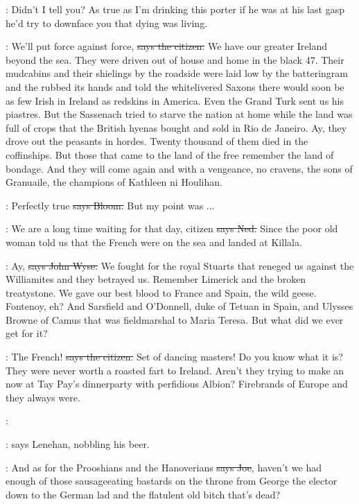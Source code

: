 \Nq:
Didn't I tell you?
As true as I'm drinking this porter
if he was at his last gasp
he'd try to downface you
that dying was living.

\citizen:
We'll put force against force,
\sout{says the citizen.}
We have our greater Ireland beyond the sea.
They were driven out of house and home in the black 47.
Their mudcabins and their shielings by the roadside were laid
low by the batteringram and the  rubbed its hands and told the
whitelivered Saxons there would soon be as few Irish in Ireland as redskins in America.
Even the Grand Turk sent us his piastres.
But the Sassenach tried to starve the nation at home
while the land was full of crops that the British hyenas bought and sold in Rio de Janeiro.
Ay,
they drove out the peasants in hordes.
Twenty thousand of them died in the coffinships.
But those that came to the land of the free remember the land of bondage.
And they will come again and with a vengeance,
no cravens,
the sons of Granuaile,
the champions of Kathleen ni Houlihan.

\Bloom:
Perfectly true
\sout{says Bloom.}
But my point was ...

\lambert:
We are a long time waiting for that day,
citizen
\sout{says Ned.}
Since the poor old woman told us that the French were on the sea and landed at Killala.

\johnwyse:
Ay,
\sout{says John Wyse.}
We fought for the royal Stuarts that reneged us
against the Williamites and they betrayed us.
Remember Limerick and the broken treatystone.
We gave our best blood to France and Spain,
the wild geese.
Fontenoy,
eh?
And Sarsfield and O'Donnell,
duke of Tetuan in Spain,
and Ulysses Browne of Camus that was fieldmarshal to Maria Teresa.
But what did we ever get for it?

\citizen:
The French!
\sout{says the citizen.}
Set of dancing masters!
Do you know what it is?
They were never worth a roasted fart to Ireland.
Aren't they trying to make an  now
at Tay Pay's dinnerparty with perfidious Albion?
Firebrands of Europe and they always were.

\lenehan:

\Nq:
says Lenehan,
nobbling his beer.

\joe:
And as for the Prooshians and the Hanoverians
\sout{says Joe},
haven't we had enough of those sausageeating bastards on the throne
from George the elector
down to the German lad
and the flatulent old bitch that's dead?

